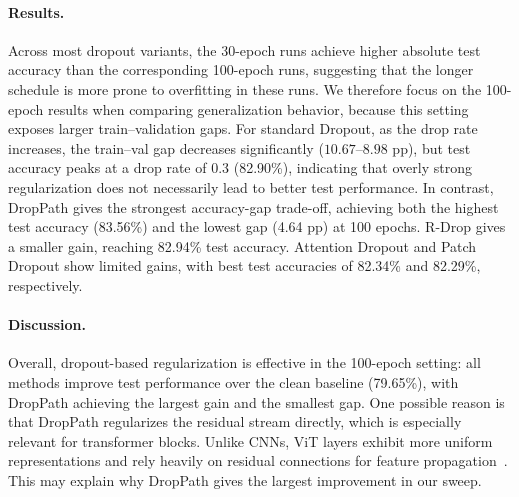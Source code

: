 \begin{table}[!htbp]
\centering
\small
\caption{Effect of patch dropout rate.}
\label{tab:droppatch}
\end{table}


\paragraph{Results.} Across most dropout variants, the 30-epoch runs achieve higher absolute test accuracy than the corresponding 100-epoch runs, suggesting that the longer schedule is more prone to overfitting in these runs. We therefore focus on the 100-epoch results when comparing generalization behavior, because this setting exposes larger train--validation gaps. For standard Dropout, as the drop rate increases, the train--val gap decreases significantly ($10.67$--$8.98$ pp), but test accuracy peaks at a drop rate of 0.3 (82.90\%), indicating that overly strong regularization does not necessarily lead to better test performance. In contrast, DropPath gives the strongest accuracy-gap trade-off, achieving both the highest test accuracy (83.56\%) and the lowest gap (4.64 pp) at 100 epochs. R-Drop gives a smaller gain, reaching 82.94\% test accuracy. Attention Dropout and Patch Dropout show limited gains, with best test accuracies of 82.34\% and 82.29\%, respectively.

\paragraph{Discussion.} Overall, dropout-based regularization is effective in the 100-epoch setting: all methods improve test performance over the clean baseline (79.65\%), with DropPath achieving the largest gain and the smallest gap. One possible reason is that DropPath regularizes the residual stream directly, which is especially relevant for transformer blocks. Unlike CNNs, ViT layers exhibit more uniform representations and rely heavily on residual connections for feature propagation~\cite{raghu2021vision}. This may explain why DropPath gives the largest improvement in our sweep.

